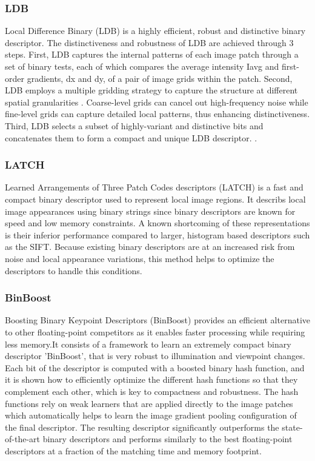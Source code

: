 \documentclass{article}[11pt]
\begin{document}
\subsubsection{LDB}

Local Difference Binary (LDB) is a highly efficient, robust and distinctive binary descriptor. The distinctiveness and robustness of LDB are achieved through 3 steps. First, LDB captures the internal patterns of each image patch through a set of binary tests, each of which compares the average intensity Iavg and first-order gradients, dx and dy, of a pair of image grids within the patch. Second, LDB employs a multiple gridding strategy to capture the structure at different spatial granularities . Coarse-level grids can cancel out high-frequency noise while fine-level grids can capture detailed local patterns, thus enhancing distinctiveness. Third, LDB selects a subset of highly-variant and distinctive bits and concatenates them to form a compact and unique LDB descriptor. .

\subsubsection{LATCH}


 Learned Arrangements of Three Patch Codes descriptors (LATCH) is a fast and compact binary descriptor used to represent local image regions. It describs local image appearances using binary strings since binary descriptors are known for speed and low memory constraints. A known shortcoming of these representations is their inferior performance compared to larger, histogram based descriptors such as the SIFT. Because existing binary descriptors are at an increased risk from noise and local appearance variations, this method helps to optimize the descriptors to handle this conditions.
\subsubsection{BinBoost}

Boosting Binary Keypoint Descriptors (BinBoost) provides an efficient alternative to other floating-point competitors as it enables faster processing while requiring less memory.It consists of a framework to learn an extremely compact binary descriptor 'BinBoost', that is very robust to illumination and viewpoint changes. Each bit of the descriptor is computed with a boosted binary hash function, and it is shown how to efficiently optimize the different hash functions so that they complement each other, which is key to compactness and robustness. The hash functions rely on weak learners that are applied directly to the image patches which  automatically helps to learn the image gradient pooling configuration of the final descriptor. The resulting descriptor significantly outperforms the state-of-the-art binary descriptors and performs similarly to the best floating-point descriptors at a fraction of the matching time and memory footprint.
    
\end{document}
